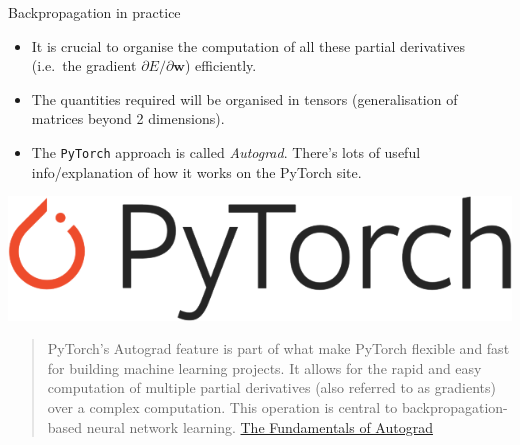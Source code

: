 \documentclass[10pt]{beamer}
\begin{document}
\begin{titledslide}{Backpropagation in practice}

  \begin{itemize}
  \item It is crucial to organise the computation of all these partial
    derivatives (i.e.\ the gradient $\partial E / \partial
    \mathbf{w}$) efficiently.
  \item The quantities required will be organised in tensors
    (generalisation of matrices beyond 2 dimensions).
  \item The \texttt{PyTorch} approach is called \emph{Autograd}.
    There's lots of useful info/explanation of how it works on the
    PyTorch site.
  \end{itemize}
\includegraphics[scale=0.1]{figures/Pytorch_logo.png}
  \begin{quotation}
    PyTorch's Autograd feature is part of what make PyTorch flexible
    and fast for building machine learning projects. It allows for the
    rapid and easy computation of multiple partial derivatives (also
    referred to as gradients) over a complex computation. This
    operation is central to backpropagation-based neural network
    learning. \href{https://pytorch.org/tutorials/beginner/introyt/autogradyt\_tutorial.html}{The
    Fundamentals of Autograd}
  \end{quotation}


\end{titledslide}
\end{document}
